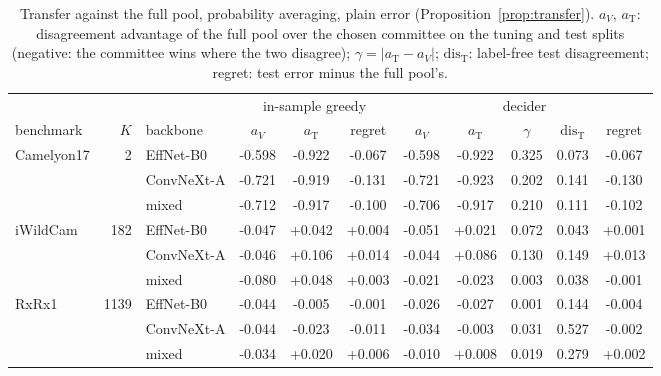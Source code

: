 \begin{table}[t]
\centering
\footnotesize
\caption{Transfer against the full pool, probability averaging, plain error (Proposition~\ref{prop:transfer}). $a_V$, $a_{\mathrm T}$: disagreement advantage of the full pool over the chosen committee on the tuning and test splits (negative: the committee wins where the two disagree); $\gamma=|a_{\mathrm T}-a_V|$; $\mathrm{dis}_{\mathrm T}$: label-free test disagreement; regret: test error minus the full pool's.}
\label{tab:gamma}
\setlength{\tabcolsep}{3.5pt}\begin{adjustbox}{max width=\linewidth}
\begin{tabular}{lrlcccccccc}
\toprule
& & & \multicolumn{3}{c}{in-sample greedy} & \multicolumn{5}{c}{decider} \\ \cmidrule(lr){4-6}\cmidrule(lr){7-11} benchmark & $K$ & backbone & $a_V$ & $a_{\mathrm T}$ & regret & $a_V$ & $a_{\mathrm T}$ & $\gamma$ & $\mathrm{dis}_{\mathrm T}$ & regret \\
\midrule
Camelyon17 & 2 & EffNet-B0 & -0.598 & -0.922 & -0.067 & -0.598 & -0.922 & 0.325 & 0.073 & -0.067 \\
 &  & ConvNeXt-A & -0.721 & -0.919 & -0.131 & -0.721 & -0.923 & 0.202 & 0.141 & -0.130 \\
 &  & mixed & -0.712 & -0.917 & -0.100 & -0.706 & -0.917 & 0.210 & 0.111 & -0.102 \\
\addlinespace
iWildCam & 182 & EffNet-B0 & -0.047 & +0.042 & +0.004 & -0.051 & +0.021 & 0.072 & 0.043 & +0.001 \\
 &  & ConvNeXt-A & -0.046 & +0.106 & +0.014 & -0.044 & +0.086 & 0.130 & 0.149 & +0.013 \\
 &  & mixed & -0.080 & +0.048 & +0.003 & -0.021 & -0.023 & 0.003 & 0.038 & -0.001 \\
\addlinespace
RxRx1 & 1139 & EffNet-B0 & -0.044 & -0.005 & -0.001 & -0.026 & -0.027 & 0.001 & 0.144 & -0.004 \\
 &  & ConvNeXt-A & -0.044 & -0.023 & -0.011 & -0.034 & -0.003 & 0.031 & 0.527 & -0.002 \\
 &  & mixed & -0.034 & +0.020 & +0.006 & -0.010 & +0.008 & 0.019 & 0.279 & +0.002 \\
\bottomrule
\end{tabular}
\end{adjustbox}
\end{table}
